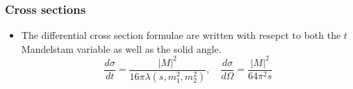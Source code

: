 \subsubsection*{Cross sections}
\begin{itemize}
	\item The differential cross section formulae 
		are written with resepct to 
		both the $ t $ Mandelstam variable 
		as well as the solid angle. 
	\[
	\frac{d \sigma }{ dt } = \frac{| M | ^ 2 }{ 16 \pi 
	\lambda \left( s, m_1^ 2 , m_2 ^ 2  \right) }, 
	\quad \frac{d \sigma }{ d \Omega }  = \frac{| M | ^ 2 }{
	64 \pi ^ 2 s }
	\] 
\end{itemize}
\pagebreak
